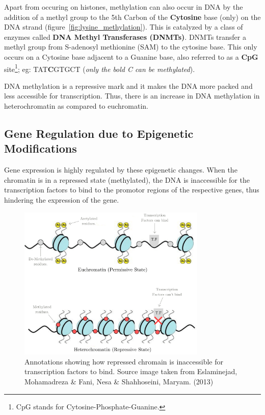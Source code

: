 \documentclass[letterpaper,12pt]{article}
\begin{document}
Apart from occuring on histones, methylation can also occur in DNA by the addition of a methyl group to the 5th Carbon of the \textbf{Cytosine} base (only) on the DNA strand (figure~\ref{fig:lysine_methylation}). This is catalyzed by a class of enzymes called \textbf{DNA Methyl Transferases (DNMTs)}. DNMTs transfer a methyl group from S-adenosyl methionine (SAM) to the cytosine base. This only occurs on a Cytosine base adjacent to a Guanine base, also referred to as a \textbf{CpG} site\footnote{CpG stands for Cytosine-Phosphate-Guanine.}; eg: TAT\textbf{C}GTGCT (\textit{only the bold C can be methylated}).

DNA methylation is a repressive mark and it makes the DNA more packed and less accessible for transcription. Thus, there is an increase in DNA methylation in heterochromatin as compared to euchromatin.


\subsection{Gene Regulation due to Epigenetic Modifications}
Gene expression is highly regulated by these epigenetic changes. When the chromatin is in a repressed state (methylated), the DNA is inaccessible for the transcription factors to bind to the promotor regions of the respective genes, thus hindering the expression of the gene.

\begin{figure}[!h]
	\centering
	\includegraphics[width=0.8\textwidth]{figures/transcription_factors.png}
	\caption{Annotations showing how repressed chromain is inaccessible for transcription factors to bind. Source image taken from Eslaminejad, Mohamadreza \& Fani, Nesa \& Shahhoseini, Maryam. (2013)}\label{fig:transcription_factors}
\end{figure}
\end{document}
